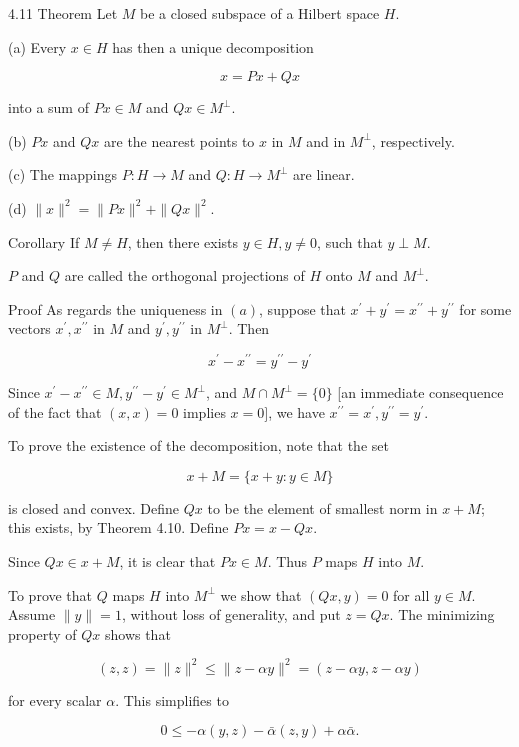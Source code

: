 \documentclass[10pt]{article}
\begin{document}
4.11 Theorem Let $M$ be a closed subspace of a Hilbert space $H$.

(a) Every $x \in H$ has then a unique decomposition

$$
x=P x+Q x
$$

into a sum of $P x \in M$ and $Q x \in M^{\perp}$.

(b) $P x$ and $Q x$ are the nearest points to $x$ in $M$ and in $M^{\perp}$, respectively.

(c) The mappings $P: H \rightarrow M$ and $Q: H \rightarrow M^{\perp}$ are linear.

(d) $\|x\|^{2}=\|P x\|^{2}+\|Q x\|^{2}$.

Corollary If $M \neq H$, then there exists $y \in H, y \neq 0$, such that $y \perp M$.

$P$ and $Q$ are called the orthogonal projections of $H$ onto $M$ and $M^{\perp}$.

Proof As regards the uniqueness in $(a)$, suppose that $x^{\prime}+y^{\prime}=x^{\prime \prime}+y^{\prime \prime}$ for some vectors $x^{\prime}, x^{\prime \prime}$ in $M$ and $y^{\prime}, y^{\prime \prime}$ in $M^{\perp}$. Then

$$
x^{\prime}-x^{\prime \prime}=y^{\prime \prime}-y^{\prime}
$$

Since $x^{\prime}-x^{\prime \prime} \in M, y^{\prime \prime}-y^{\prime} \in M^{\perp}$, and $M \cap M^{\perp}=\{0\}$ [an immediate consequence of the fact that $(x, x)=0$ implies $x=0]$, we have $x^{\prime \prime}=x^{\prime}, y^{\prime \prime}=y^{\prime}$.

To prove the existence of the decomposition, note that the set

$$
x+M=\{x+y: y \in M\}
$$

is closed and convex. Define $Q x$ to be the element of smallest norm in $x+M$; this exists, by Theorem 4.10. Define $P x=x-Q x$.

Since $Q x \in x+M$, it is clear that $P x \in M$. Thus $P$ maps $H$ into $M$.

To prove that $Q$ maps $H$ into $M^{\perp}$ we show that $(Q x, y)=0$ for all $y \in M$. Assume $\|y\|=1$, without loss of generality, and put $z=Q x$. The minimizing property of $Q x$ shows that

$$
(z, z)=\|z\|^{2} \leq\|z-\alpha y\|^{2}=(z-\alpha y, z-\alpha y)
$$

for every scalar $\alpha$. This simplifies to

$$
0 \leq-\alpha(y, z)-\bar{\alpha}(z, y)+\alpha \bar{\alpha} .
$$
\end{document}
